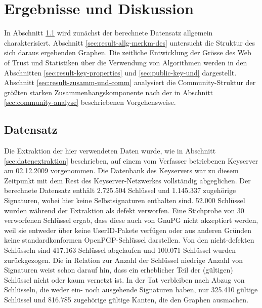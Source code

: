 
\chapter{Ergebnisse und Diskussion}
\label{ch:Ergebnisse}
In Abschnitt \ref{sec:datensatz} wird zunächst der berechnete
Datensatz allgemein charakterisiert. Abschnitt
\ref{sec:result-allg-merkm-des} untersucht die Struktur des sich
daraus ergebenden Graphen. Die zeitliche Entwicklung der Gr\"osse des
Web of Trust und Statistiken \"uber die Verwendung von Algorithmen
werden in den Abschnitten \ref{sec:result-key-properties} und
\ref{sec:public-key-und} dargestellt. Abschnitt
\ref{sec:result-zusamm-und-comm} analysiert die Community-Struktur der
größten starken Zusammenhangskomponente nach der in Abschnitt
\ref{sec:community-analyse} beschriebenen Vorgehensweise.

\section{Datensatz}
\label{sec:datensatz}

Die Extraktion der hier verwendeten Daten wurde, wie in Abschnitt
\ref{sec:datenextraktion} beschrieben, auf einem vom
Verfasser betriebenen Keyserver am 02.12.2009 vorgenommen. Die
Datenbank des Keyservers war zu diesem Zeitpunkt mit dem Rest des
Keyserver-Netzwerkes vollständig abgeglichen. Der berechnete
Datensatz enthält 2.725.504 Schlüssel und 1.145.337 zugehörige
Signaturen, wobei hier keine Selbstsignaturen enthalten sind. 52.000
Schlüssel wurden während der Extraktion als defekt verworfen. Eine
Stichprobe von 30 verworfenen Schlüssel ergab, dass diese auch von
GnuPG nicht akzeptiert werden, weil sie entweder über keine
UserID-Pakete verfügen oder aus anderen Gründen keine
standardkonformen OpenPGP-Schlüssel darstellen. Von den
nicht-defekten Schlüsseln sind 417.163 Schlüssel abgelaufen und
100.071 Schlüssel wurden zurückgezogen. Die in Relation zur Anzahl
der Schlüssel niedrige Anzahl von Signaturen weist schon darauf hin,
dass ein erheblicher Teil der (gültigen) Schlüssel nicht oder kaum
vernetzt ist. In der Tat verbleiben nach Abzug von Schlüsseln, die
weder ein- noch ausgehende Signaturen haben, nur 325.410 gültige
Schlüssel und 816.785 zugehörige gültige Kanten, die den Graphen
ausmachen.

